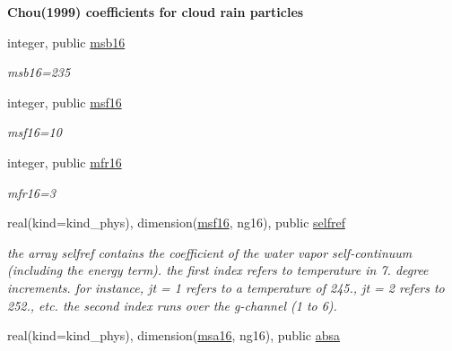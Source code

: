 \begin{Indent}\textbf{ Chou(1999) coefficients for cloud rain particles}\par
\begin{DoxyCompactItemize}
\item 
integer, public \hyperlink{group__module__radsw__kgbnn_ga2ce1ab36897fb1fc7d85cbf7fe539e59}{msb16}
\begin{DoxyCompactList}\small\item\em msb16=235 \end{DoxyCompactList}\item 
integer, public \hyperlink{group__module__radsw__kgbnn_gab35df3f7d231e98fbef5738119138907}{msf16}
\begin{DoxyCompactList}\small\item\em msf16=10 \end{DoxyCompactList}\item 
integer, public \hyperlink{group__module__radsw__kgbnn_gaeee3fe8e44f6fbd9a6a008bc9f97f37c}{mfr16}
\begin{DoxyCompactList}\small\item\em mfr16=3 \end{DoxyCompactList}\item 
real(kind=kind\+\_\+phys), dimension(\hyperlink{group__module__radsw__kgbnn_gab35df3f7d231e98fbef5738119138907}{msf16}, ng16), public \hyperlink{group__module__radsw__kgbnn_ga77d98f3fb766d4abfd494332ce67c2c2}{selfref}
\begin{DoxyCompactList}\small\item\em the array selfref contains the coefficient of the water vapor self-\/continuum (including the energy term). the first index refers to temperature in 7. degree increments. for instance, jt = 1 refers to a temperature of 245., jt = 2 refers to 252., etc. the second index runs over the g-\/channel (1 to 6). \end{DoxyCompactList}\item 
real(kind=kind\+\_\+phys), dimension(\hyperlink{namespacemodule__radsw__kgb16_ad76a9d79e77228ac93ec3db96eed2b29}{msa16}, ng16), public \hyperlink{group__module__radsw__kgbnn_ga51fe40b5f24cc461850fe5be40d18869}{absa}

\end{DoxyCompactItemize}
\end{Indent}
